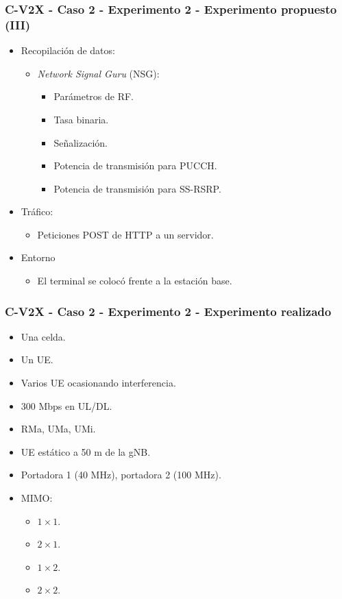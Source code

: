 \documentclass{beamer}
\begin{document}
\begin{frame}
\frametitle{C-V2X - Caso 2 - Experimento 2 - Experimento propuesto (III)}

\begin{itemize}
\item {
	Recopilación de datos:
	\begin{itemize}
	\item {
		\textit{Network Signal Guru} (NSG):
		\begin{itemize}
		\item Parámetros de RF.
		\item Tasa binaria.
		\item Señalización.
		\item Potencia de transmisión para PUCCH.
		\item Potencia de transmisión para SS-RSRP.
		\end{itemize}
	}
	\end{itemize}
}
\item {
	Tráfico:
	\begin{itemize}
	\item Peticiones POST de HTTP a un servidor.
	\end{itemize}
}
\item {
	Entorno
	\begin{itemize}
	\item El terminal se colocó frente a la estación base.
	\end{itemize}
}
\end{itemize}
\end{frame}

\begin{frame}
\frametitle{C-V2X - Caso 2 - Experimento 2 - Experimento realizado}

\begin{itemize}
\item Una celda.
\item Un UE.
\item Varios UE ocasionando interferencia.
\item 300 Mbps en UL/DL.
\item RMa, UMa, UMi.
\item UE estático a 50 m de la gNB.
\item Portadora 1 (40 MHz), portadora 2 (100 MHz).
\item {
	MIMO:
	\begin{itemize}
	\item $1 \times 1$.
	\item $2 \times 1$.
	\item $1 \times 2$.
	\item $2 \times 2$.
	\end{itemize}
}
\end{itemize}
\end{frame}
\end{document}
